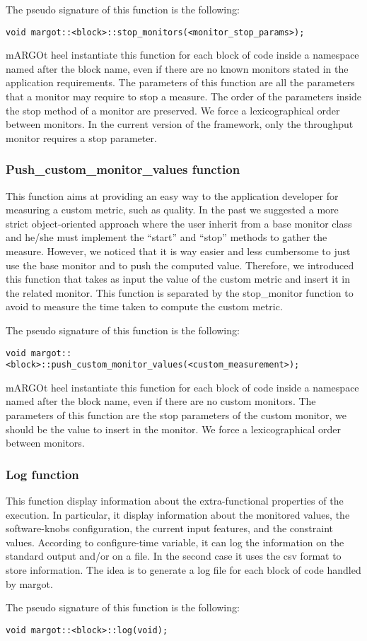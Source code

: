 The pseudo signature of this function is the following:
\begin{lstlisting}
void margot::<block>::stop_monitors(<monitor_stop_params>);
\end{lstlisting}
mARGOt heel instantiate this function for each block of code inside a namespace named after the block name, even if there are no known monitors stated in the application requirements.
The parameters of this function are all the parameters that a monitor may require to stop a measure.
The order of the parameters inside the stop method of a monitor are preserved.
We force a lexicographical order between monitors.
In the current version of the framework, only the throughput monitor requires a stop parameter.



\subsubsection*{Push\_custom\_monitor\_values function}

This function aims at providing an easy way to the application developer for measuring a custom metric, such as quality.
In the past we suggested a more strict object-oriented approach where the user inherit from a base monitor class and he/she must implement the ``start'' and ``stop'' methods to gather the measure.
However, we noticed that it is way easier and less cumbersome to just use the base monitor and to push the computed value.
Therefore, we introduced this function that takes as input the value of the custom metric and insert it in the related monitor.
This function is separated by the stop\_monitor function to avoid to measure the time taken to compute the custom metric.

The pseudo signature of this function is the following:
\begin{lstlisting}
void margot::<block>::push_custom_monitor_values(<custom_measurement>);
\end{lstlisting}
mARGOt heel instantiate this function for each block of code inside a namespace named after the block name, even if there are no custom monitors.
The parameters of this function are the stop parameters of the custom monitor, we should be the value to insert in the monitor.
We force a lexicographical order between monitors.


\subsubsection*{Log function}

This function display information about the extra-functional properties of the execution.
In particular, it display information about the monitored values, the software-knobs configuration, the current input features, and the constraint values.
According to configure-time variable, it can log the information on the standard output and/or on a file.
In the second case it uses the csv format to store information.
The idea is to generate a log file for each block of code handled by margot.

The pseudo signature of this function is the following:
\begin{lstlisting}
void margot::<block>::log(void);
\end{lstlisting}